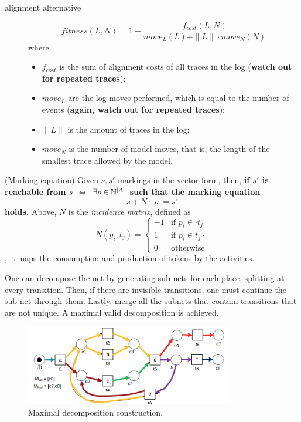 \documentclass[a4paper]{report}
\begin{document}
\begin{description}
\item[alignment alternative] \[
	fitness(L,N) = 1 - \frac{f_{cost}(L,N)}{move_L(L) + \|L\|\cdot move_N(N)}
    \] where 
    \begin{itemize}
        \item $f_{cost}$ is the sum of alignment costs of all traces in the log (\textbf{watch out for repeated traces});
	\item $move_L$ are the log moves performed, which is equal to the number of events (\textbf{again, watch out for repeated traces});
	\item $\|L\|$ is the amount of traces in the log;
	\item $move_N$ is the number of model moves, that is, the length of the smallest trace allowed by the model.
    \end{itemize}
\end{description}

\begin{definition}
    (Marking equation) Given $s,s'$ markings in the vector form, then, \textbf{if $s'$ is reachable from $s$ $\iff$ $\exists \varrho\in \mathbb{N}^{|A|}$ such that the marking equation \[
	s + N\cdot \varrho = s'
\] holds.}
    Above, $N$ is the \emph{incidence matrix}, defined as \[
	N(p_i, t_j) = 
	\begin{cases}
	    -1 & \text{if } p_i \in \cdot t_j \\
	    1 & \text{if } p_i \in t_j\cdot  \\
	    0 & \text{otherwise}
	\end{cases}
    \], it maps the consumption and production of tokens by the activities.
\end{definition}

\begin{note}
    One can decompose the net by generating sub-nets for each place, splitting at every transition. Then, if there are invisible transitions, one must continue the sub-net through them. Lastly, merge all the subnets that contain transitions that are not unique. A maximal valid decomposition is achieved.
\end{note}

\begin{figure}[h]
    \centering
    \includegraphics[width=0.8\textwidth]{maximal_decomposition.png}
    \caption{Maximal decomposition construction.}
    \label{fig:maximal_decomposition-png}
\end{figure}
\end{document}
